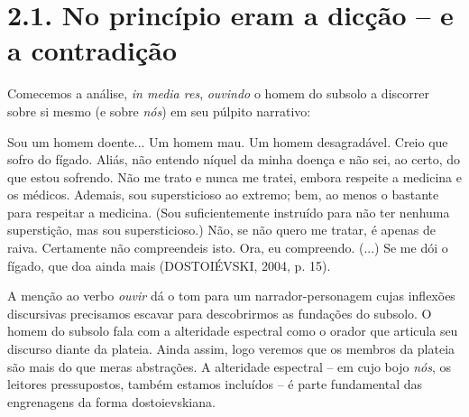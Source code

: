 
\section{2.1. No princípio eram a dicção -- e a contradição}

Comecemos a análise, \emph{in media res}, \emph{ouvindo} o homem do
subsolo a discorrer sobre si mesmo (e sobre \emph{nós}) em seu púlpito
narrativo:

Sou um homem doente... Um homem mau. Um homem desagradável. Creio que
sofro do fígado. Aliás, não entendo níquel da minha doença e não sei, ao
certo, do que estou sofrendo. Não me trato e nunca me tratei, embora
respeite a medicina e os médicos. Ademais, sou supersticioso ao extremo;
bem, ao menos o bastante para respeitar a medicina. (Sou suficientemente
instruído para não ter nenhuma superstição, mas sou supersticioso.) Não,
se não quero me tratar, é apenas de raiva. Certamente não compreendeis
isto. Ora, eu compreendo. (...) Se me dói o fígado, que doa ainda mais
(DOSTOIÉVSKI, 2004, p. 15).

A menção ao verbo \emph{ouvir} dá o tom para um narrador-personagem
cujas inflexões discursivas precisamos escavar para descobrirmos as
fundações do subsolo. O homem do subsolo fala com a alteridade espectral
como o orador que articula seu discurso diante da plateia. Ainda assim,
logo veremos que os membros da plateia são mais do que meras abstrações.
A alteridade espectral -- em cujo bojo \emph{nós}, os leitores
pressupostos, também estamos incluídos -- é parte fundamental das
engrenagens da forma dostoievskiana.

